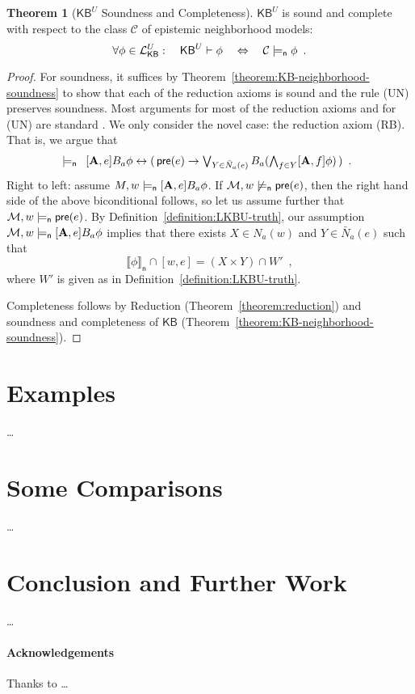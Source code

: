 \documentclass[12pt]{article}
\newcommand{\XXXcomment}[1]{}
\newcommand{\XXXcomment}[1]{\marginpar{\color{blue}{\footnotesize #1}}}
\theoremstyle{definition}
\newtheorem{theorem}{Theorem}[section]
\newcommand{\M}{{\cal M}}      %
\newcommand{\Lang}{{\cal L}}   %
\newcommand{\pre}{\mathsf{pre}}
\newcommand{\A}{{\bf A}}
\newcommand{\KB}{{\mathsf{KB}}}                        %
\newcommand{\modelsn}{\models_{\mathsf{n}}}                  %
\newcommand{\semn}[1]{\llbracket{#1}\rrbracket_{\mathsf{n}}} %
\begin{document}
\begin{theorem}[$\KB^U$ Soundness and Completeness]
  $\KB^U$ is sound and complete with respect to the class
  $\mathcal{C}$ of epistemic neighborhood models:
  \[
  \forall\phi\in\Lang_\KB^U:\quad\KB^U\vdash\phi
  \quad\Leftrightarrow\quad
  \mathcal{C}\modelsn\phi
  \enspace.
  \]
\end{theorem}
\begin{proof}
  \XXXcomment{BR: insert proof of (RB) soundness. Fix axiom (RB).}
  For soundness, it suffices by
  Theorem~\ref{theorem:KB-neighborhood-soundness} to show that each of
  the reduction axioms is sound and the rule (UN) preserves soundness.
  Most arguments for most of the reduction axioms and for (UN) are
  standard \cite{DitHoeKoo06:del}.  We only consider the novel case:
  the reduction axiom (RB).  That is, we argue that
  \[
  \textstyle \modelsn 
  \begin{array}[t]{l}
    [\A,e]B_a\phi \leftrightarrow 
    (\,\pre(e)\to
    \bigvee_{Y\in\bar{N}_a(e)} B_a(\bigwedge_{f\in Y}[\A,f]\phi)\,) \enspace.
  \end{array}
  \]
  Right to left: assume $M,w\modelsn[\A,e]B_a\phi$.  If
  $\M,w\not\modelsn\pre(e)$, then the right hand side of the above
  biconditional follows, so let us assume further that
  $\M,w\modelsn\pre(e)$. By Definition~\ref{definition:LKBU-truth}, our
  assumption $\M,w\modelsn[\A,e]B_a\phi$ implies that there exists
  $X\in N_a(w)$ and $Y\in\bar{N}_a(e)$ such that
  \[
  \semn{\phi}\cap[w,e]=(X\times Y)\cap W'\enspace,
  \]
  where $W'$ is given as in Definition~\ref{definition:LKBU-truth}.


  Completeness follows by Reduction (Theorem~\ref{theorem:reduction})
  and soundness and completeness of $\KB$
  (Theorem~\ref{theorem:KB-neighborhood-soundness}).
\end{proof}

\section{Examples} 

\ldots 

\section{Some Comparisons} 

\ldots 

\section{Conclusion and Further Work} 

\ldots 

\paragraph{Acknowledgements} 

Thanks to \ldots 



\end{document}
